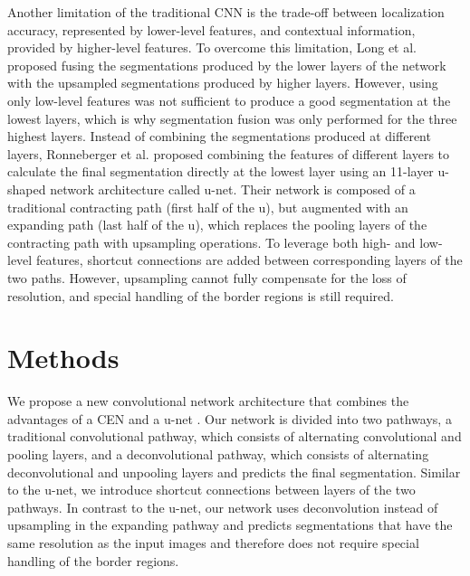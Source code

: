 Another limitation of the traditional CNN is the trade-off between localization
accuracy, represented by lower-level features, and contextual information,
provided by higher-level features. To overcome this limitation, Long et al.
\cite{long2015} proposed fusing the segmentations produced by the lower layers of the network
with the upsampled segmentations produced by higher layers. However, using only
low-level features was not sufficient to produce a good segmentation at the
lowest layers, which is why segmentation fusion was only performed for the three
highest layers.
Instead of combining the segmentations produced at
different layers, Ronneberger et al. \cite{ronneberger2015} proposed combining
the features of different layers to calculate the final segmentation
directly at the lowest layer using an 11-layer u-shaped network architecture
called u-net. Their network is
composed of a traditional contracting path (first half of the u), but augmented
with an expanding path (last half of the u), which replaces the pooling layers
of the contracting path with upsampling operations. To leverage both high- and
low-level features, shortcut connections are added between corresponding layers
of the two paths.
However,
upsampling cannot fully compensate for the loss of resolution, and special
handling of the border regions is still required.


\section{Methods}
\label{sec:method}

We propose a new convolutional network architecture that combines the advantages
of a CEN \cite{brosch2015} and a u-net \cite{ronneberger2015}. Our
network is divided into two pathways, a traditional convolutional pathway, which
consists of alternating convolutional and pooling layers, and a deconvolutional
pathway, which consists of alternating deconvolutional and unpooling layers and
predicts the final segmentation. Similar to the u-net, we introduce shortcut
connections between layers of the two pathways. In contrast to the u-net, our
network uses deconvolution instead of upsampling in the expanding pathway and
predicts segmentations that have the same resolution as the input images and
therefore does not require special handling of the border regions.

